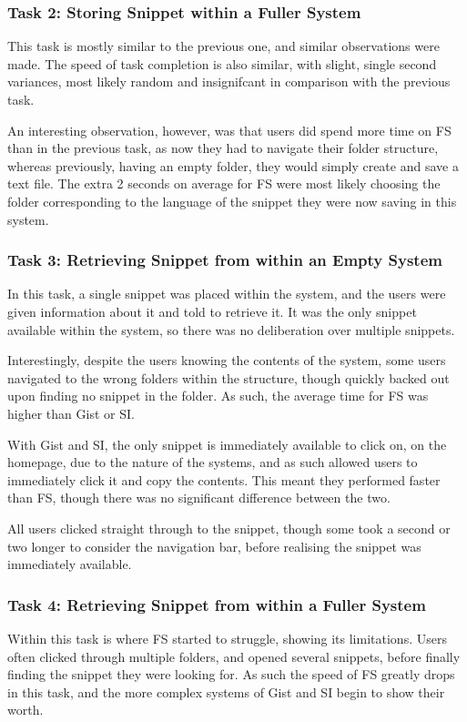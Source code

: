 \subsubsection{Task 2: Storing Snippet within a Fuller System}
This task is mostly similar to the previous one, and similar observations were made.
The speed of task completion is also similar, with slight, single second variances, most likely random and insignifcant in comparison with the previous task.

An interesting observation, however, was that users did spend more time on FS than in the previous task, as now they had to navigate their folder structure, whereas previously, having an empty folder, they would simply create and save a text file.
The extra 2 seconds on average for FS were most likely choosing the folder corresponding to the language of the snippet they were now saving in this system.

\subsubsection{Task 3: Retrieving Snippet from within an Empty System}
In this task, a single snippet was placed within the system, and the users were given information about it and told to retrieve it.
It was the only snippet available within the system, so there was no deliberation over multiple snippets.

Interestingly, despite the users knowing the contents of the system, some users navigated to the wrong folders within the structure, though quickly backed out upon finding no snippet in the folder.
As such, the average time for FS was higher than Gist or SI.

With Gist and SI, the only snippet is immediately available to click on, on the homepage, due to the nature of the systems, and as such allowed users to immediately click it and copy the contents.
This meant they performed faster than FS, though there was no significant difference between the two. 

All users clicked straight through to the snippet, though some took a second or two longer to consider the navigation bar, before realising the snippet was immediately available.

\subsubsection{Task 4: Retrieving Snippet from within a Fuller System}
Within this task is where FS started to struggle, showing its limitations.
Users often clicked through multiple folders, and opened several snippets, before finally finding the snippet they were looking for.
As such the speed of FS greatly drops in this task, and the more complex systems of Gist and SI begin to show their worth.


